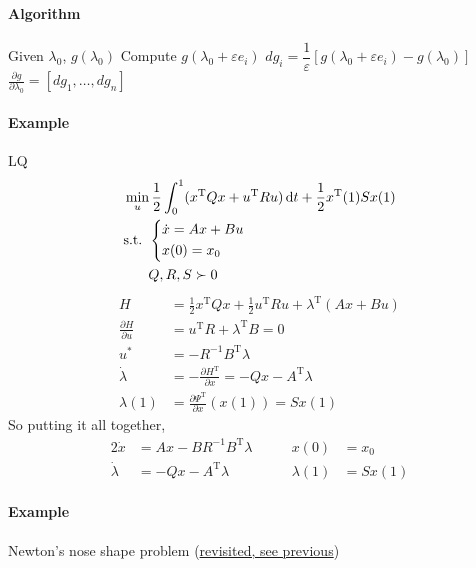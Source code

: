 \documentclass[letterpaper,12pt,titlepage]{report}
\newcommand*\dif{\mathop{}\!\mathrm{d}}
\newcommand{\trans}{^\text{T}}
\newcommand*\pder[2]{\frac{\partial #1}{\partial #2}}
\theoremstyle{plain}
\theoremstyle{definition}
\begin{document}
\paragraph{Algorithm} \mbox{}
\begin{algorithm}
    \begin{algorithmic}
        \State Given $\lambda_0$, $g(\lambda_0)$
        \State Compute $g(\lambda_0+\varepsilon e_i)$
        \State $dg_i = \dfrac{1}{\varepsilon} [g(\lambda_0+\varepsilon e_i) - g(\lambda_0)]$
        \EndFor
        \smallskip
        \State $\displaystyle\pder{g}{\lambda_0} = [dg_1,\dots,dg_n]$
    \end{algorithmic}
\end{algorithm}

\paragraph{Example} LQ
\begin{align}
    & \min_u \frac12 \int_0^1 (x\trans Qx + u\trans Ru) \dif t + \frac12 x\trans(1)Sx(1) \\
    & \text{s.t. } \begin{dcases}
        \dot x = Ax + Bu \\
        x(0) = x_0
    \end{dcases} \\
    & \phantom{\text{s.t. }} Q,R,S \succ 0
\end{align}
\begin{align}
    H &= \frac12 x\trans Qx + \frac12 u\trans Ru + \lambda\trans(Ax+Bu) \\
    \pder{H}{u} &= u\trans R + \lambda\trans B = 0 \\
    u^* &= -R^{-1}B\trans \lambda \\
    \dot\lambda &= -\pder{H\trans}{x} = -Qx - A\trans\lambda \\
    \lambda(1) &= \pder{\Psi\trans}{x}(x(1)) = Sx(1)
\end{align}
So putting it all together,
\begin{alignat}{2}
    \dot x &= Ax - BR^{-1}B\trans\lambda \qquad & x(0) &= x_0 \\
    \dot\lambda &= -Qx - A\trans\lambda & \lambda(1) &= Sx(1)
\end{alignat}

\paragraph{Example} Newton's nose shape problem (\hyperlink{newton_nose_shape}{revisited, see previous})
\end{document}
